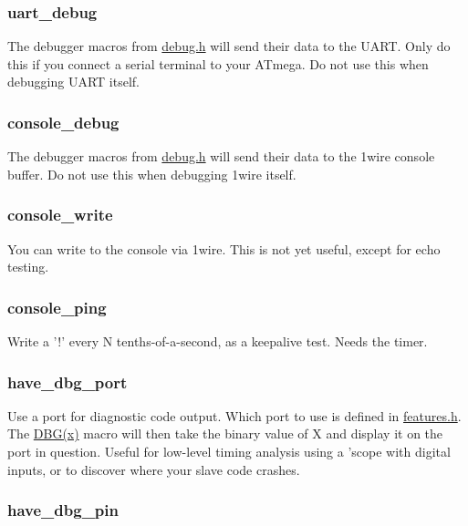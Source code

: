 \subsubsection*{{\ttfamily uart\-\_\-debug}}

The debugger macros from {\ttfamily \hyperlink{debug_8h}{debug.\-h}} will send their data to the U\-A\-R\-T. Only do this if you connect a serial terminal to your A\-Tmega. Do not use this when debugging U\-A\-R\-T itself.

\subsubsection*{{\ttfamily console\-\_\-debug}}

The debugger macros from {\ttfamily \hyperlink{debug_8h}{debug.\-h}} will send their data to the 1wire console buffer. Do not use this when debugging 1wire itself.

\subsubsection*{{\ttfamily console\-\_\-write}}

You can write to the console via 1wire. This is not yet useful, except for echo testing.

\subsubsection*{{\ttfamily console\-\_\-ping}}

Write a '!' every N tenths-\/of-\/a-\/second, as a keepalive test. Needs the timer.

\subsubsection*{{\ttfamily have\-\_\-dbg\-\_\-port}}

Use a port for diagnostic code output. Which port to use is defined in {\ttfamily \hyperlink{features_8h}{features.\-h}}. The \hyperlink{debug_8h_a32adf79142f0a426b5e782fb7cd4cad3}{D\-B\-G(x)} macro will then take the binary value of X and display it on the port in question. Useful for low-\/level timing analysis using a 'scope with digital inputs, or to discover where your slave code crashes.

\subsubsection*{{\ttfamily have\-\_\-dbg\-\_\-pin}}

